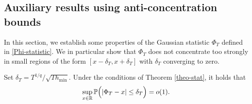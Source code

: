 \subsection*{Auxiliary results using anti-concentration bounds}


In this section, we establish some properties of the Gaussian statistic $\Phi_T$ defined in \eqref{Phi-statistic}. We in particular show that $\Phi_T$ does not concentrate too strongly in small regions of the form $[x-\delta_T,x+\delta_T]$ with $\delta_T$ converging to zero.  
%
%
\begin{propA}\label{propA-anticon}
Set $\delta_T = T^{1/q} / \sqrt{T h_{\min}}$. Under the conditions of Theorem \ref{theo-stat}, it holds that 
\[ \sup_{x \in \mathbb{R}} \mathbb{P} \Big( | \Phi_T - x | \le \delta_T \Big) = o(1). \]
\end{propA}
%
%

